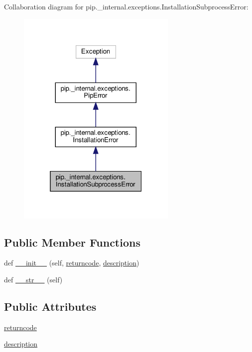 Collaboration diagram for pip.\+\_\+internal.\+exceptions.\+Installation\+Subprocess\+Error\+:
\nopagebreak
\begin{figure}[H]
\begin{center}
\leavevmode
\includegraphics[width=217pt]{classpip_1_1__internal_1_1exceptions_1_1InstallationSubprocessError__coll__graph}
\end{center}
\end{figure}
\subsection*{Public Member Functions}
\begin{DoxyCompactItemize}
\item 
def \hyperlink{classpip_1_1__internal_1_1exceptions_1_1InstallationSubprocessError_a339753709896512d09ccd55f3743a081}{\+\_\+\+\_\+init\+\_\+\+\_\+} (self, \hyperlink{classpip_1_1__internal_1_1exceptions_1_1InstallationSubprocessError_a4e205216e49251faef2956ee1d982440}{returncode}, \hyperlink{classpip_1_1__internal_1_1exceptions_1_1InstallationSubprocessError_a1d3b2a0fd23e1cf775740a46d3a50be0}{description})
\item 
def \hyperlink{classpip_1_1__internal_1_1exceptions_1_1InstallationSubprocessError_ad20ba90f39f6b572c2e60fdd66ddb432}{\+\_\+\+\_\+str\+\_\+\+\_\+} (self)
\end{DoxyCompactItemize}
\subsection*{Public Attributes}
\begin{DoxyCompactItemize}
\item 
\hyperlink{classpip_1_1__internal_1_1exceptions_1_1InstallationSubprocessError_a4e205216e49251faef2956ee1d982440}{returncode}
\item 
\hyperlink{classpip_1_1__internal_1_1exceptions_1_1InstallationSubprocessError_a1d3b2a0fd23e1cf775740a46d3a50be0}{description}
\end{DoxyCompactItemize}


